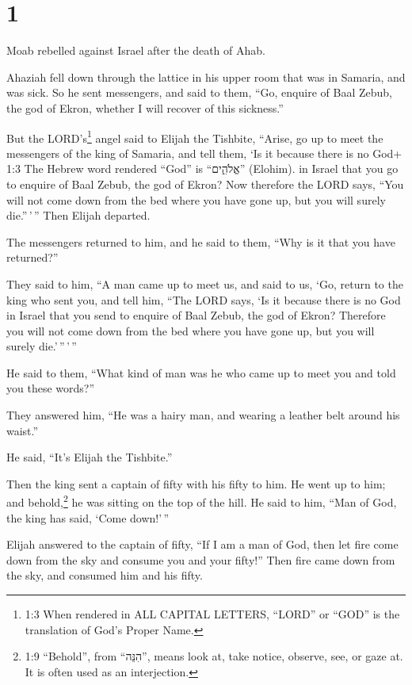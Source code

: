 \hypertarget{section}{%
\section{1}\label{section}}

 Moab rebelled against Israel after the death of Ahab.

 Ahaziah fell down through the lattice in his upper room
that was in Samaria, and was sick. So he sent messengers, and said to
them, ``Go, enquire of Baal Zebub, the god of Ekron, whether I will
recover of this sickness.''

 But the LORD's\footnote{1:3 When rendered in ALL CAPITAL
  LETTERS, ``LORD'' or ``GOD'' is the translation of God's Proper Name.}
angel said to Elijah the Tishbite, ``Arise, go up to meet the messengers
of the king of Samaria, and tell them, `Is it because there is no God+
1:3 The Hebrew word rendered ``God'' is ``אֱלֹהִ֑ים'' (Elohim). in
Israel that you go to enquire of Baal Zebub, the god of Ekron?
 Now therefore the LORD says, ``You will not come down from
the bed where you have gone up, but you will surely die.''\,'\,'' Then
Elijah departed.

 The messengers returned to him, and he said to them, ``Why
is it that you have returned?''

 They said to him, ``A man came up to meet us, and said to
us, `Go, return to the king who sent you, and tell him, ``The LORD says,
`Is it because there is no God in Israel that you send to enquire of
Baal Zebub, the god of Ekron? Therefore you will not come down from the
bed where you have gone up, but you will surely die.'\,''\,'\,''

 He said to them, ``What kind of man was he who came up to
meet you and told you these words?''

 They answered him, ``He was a hairy man, and wearing a
leather belt around his waist.''

He said, ``It's Elijah the Tishbite.''

 Then the king sent a captain of fifty with his fifty to
him. He went up to him; and behold,\footnote{1:9 ``Behold'', from
  ``הִנֵּה'', means look at, take notice, observe, see, or gaze at. It
  is often used as an interjection.} he was sitting on the top of the
hill. He said to him, ``Man of God, the king has said, `Come down!'\,''

 Elijah answered to the captain of fifty, ``If I am a man
of God, then let fire come down from the sky and consume you and your
fifty!'' Then fire came down from the sky, and consumed him and his
fifty.

